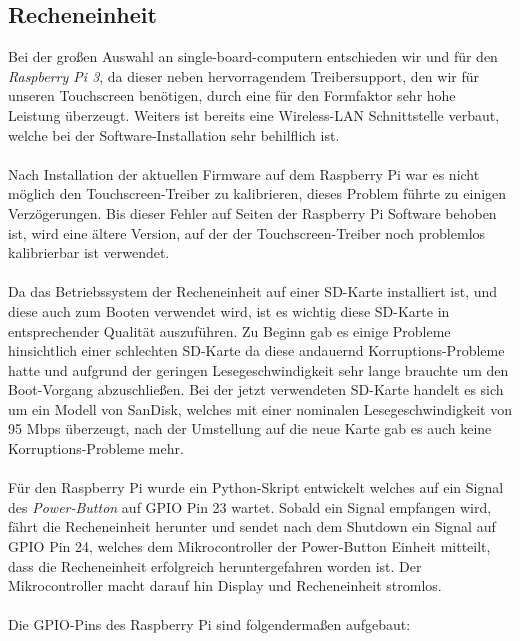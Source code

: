\subsection{Recheneinheit}
Bei der großen Auswahl an single-board-computern entschieden wir und für den \textit{Raspberry Pi 3}, da dieser neben hervorragendem Treibersupport, den wir für unseren Touchscreen benötigen, durch eine für den Formfaktor sehr hohe Leistung überzeugt. Weiters ist bereits eine Wireless-LAN Schnittstelle verbaut, welche bei der Software-Installation sehr behilflich ist.\\
\\
Nach Installation der aktuellen Firmware auf dem Raspberry Pi war es nicht möglich den Touchscreen-Treiber zu kalibrieren, dieses Problem führte zu einigen Verzögerungen. Bis dieser Fehler auf Seiten der Raspberry Pi Software behoben ist, wird eine ältere Version, auf der der Touchscreen-Treiber noch problemlos kalibrierbar ist verwendet.\\
\\
Da das Betriebssystem der Recheneinheit auf einer SD-Karte installiert ist, und diese auch zum Booten verwendet wird, ist es wichtig diese SD-Karte in entsprechender Qualität auszuführen. Zu Beginn gab es einige Probleme hinsichtlich einer schlechten SD-Karte da diese andauernd Korruptions-Probleme hatte und aufgrund der geringen Lesegeschwindigkeit sehr lange brauchte um den Boot-Vorgang abzuschließen. Bei der jetzt verwendeten SD-Karte handelt es sich um ein Modell von SanDisk, welches mit einer nominalen Lesegeschwindigkeit von 95 Mbps überzeugt, nach der Umstellung auf die neue Karte gab es auch keine Korruptions-Probleme mehr.\\
\\
Für den Raspberry Pi wurde ein Python-Skript entwickelt welches auf ein Signal des \textit{Power-Button} auf GPIO Pin 23 wartet. Sobald ein Signal empfangen wird, fährt die Recheneinheit herunter und sendet nach dem Shutdown ein Signal auf GPIO Pin 24, welches dem Mikrocontroller der Power-Button Einheit mitteilt, dass die Recheneinheit erfolgreich heruntergefahren worden ist. Der Mikrocontroller macht darauf hin Display und Recheneinheit stromlos.\\
\\
Die GPIO-Pins des Raspberry Pi sind folgendermaßen aufgebaut:\\


